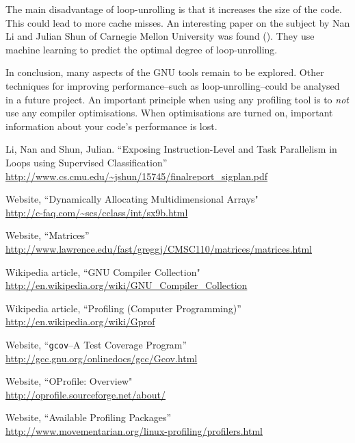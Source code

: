 \documentclass{article}
\begin{document}
The main disadvantage of loop-unrolling is that it increases the size of the code. This could lead to more cache misses. An interesting paper on the subject by Nan Li and Julian Shun of Carnegie Mellon University was found (\cite{loopunrolling}). They use machine learning to predict the optimal degree of loop-unrolling. 

In conclusion, many aspects of the GNU tools remain to be explored. Other techniques for improving performance--such as loop-unrolling--could be analysed in a future project. An important principle when using any profiling tool is to \emph{not} use any compiler optimisations. When optimisations are turned on, important information about your code's performance is lost. 

\newpage

\begin{thebibliography}{9} 
 Li, Nan and Shun, Julian. ``Exposing Instruction-Level and Task Parallelism
in Loops using Supervised Classiﬁcation''
\url{http://www.cs.cmu.edu/~jshun/15745/finalreport_sigplan.pdf}

 Website, ``Dynamically Allocating Multidimensional Arrays" \\
	\url{http://c-faq.com/~scs/cclass/int/sx9b.html}
	
 Website, ``Matrices'' \\
	\url{http://www.lawrence.edu/fast/greggj/CMSC110/matrices/matrices.html}	
	
 Wikipedia article, ``GNU Compiler Collection" \\
	\url{http://en.wikipedia.org/wiki/GNU_Compiler_Collection}

 Wikipedia article, ``Profiling (Computer Programming)'' \\
	\url{http://en.wikipedia.org/wiki/Gprof}

 Website, ``\verb=gcov=--A Test Coverage Program'' \\
	\url{http://gcc.gnu.org/onlinedocs/gcc/Gcov.html}
	
 Website, ``OProfile: Overview" \\
	\url{http://oprofile.sourceforge.net/about/}

 Website, ``Available Profiling Packages'' \\
	\url{http://www.movementarian.org/linux-profiling/profilers.html}
	
\end{thebibliography} 
\end{document}
